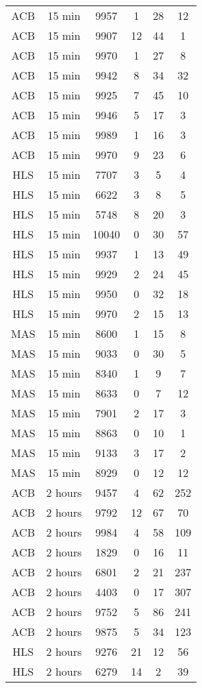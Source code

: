 \begin{center}
\begin{longtable}{cccccc}
\hline \hline
\endlastfoot
ACB	&	15 min	&	9957	&	1	&	28	&	12	\\
ACB	&	15 min	&	9907	&	12	&	44	&	1	\\
ACB	&	15 min	&	9970	&	1	&	27	&	8	\\
ACB	&	15 min	&	9942	&	8	&	34	&	32	\\
ACB	&	15 min	&	9925	&	7	&	45	&	10	\\
ACB	&	15 min	&	9946	&	5	&	17	&	3	\\
ACB	&	15 min	&	9989	&	1	&	16	&	3	\\
ACB	&	15 min	&	9970	&	9	&	23	&	6	\\
HLS	&	15 min	&	7707	&	3	&	5	&	4	\\
HLS	&	15 min	&	6622	&	3	&	8	&	5	\\
HLS	&	15 min	&	5748	&	8	&	20	&	3	\\
HLS	&	15 min	&	10040	&	0	&	30	&	57	\\
HLS	&	15 min	&	9937	&	1	&	13	&	49	\\
HLS	&	15 min	&	9929	&	2	&	24	&	45	\\
HLS	&	15 min	&	9950	&	0	&	32	&	18	\\
HLS	&	15 min	&	9970	&	2	&	15	&	13	\\
MAS	&	15 min	&	8600	&	1	&	15	&	8	\\
MAS	&	15 min	&	9033	&	0	&	30	&	5	\\
MAS	&	15 min	&	8340	&	1	&	9	&	7	\\
MAS	&	15 min	&	8633	&	0	&	7	&	12	\\
MAS	&	15 min	&	7901	&	2	&	17	&	3	\\
MAS	&	15 min	&	8863	&	0	&	10	&	1	\\
MAS	&	15 min	&	9133	&	3	&	17	&	2	\\
MAS	&	15 min	&	8929	&	0	&	12	&	12	\\
ACB	&	2 hours	&	9457	&	4	&	62	&	252	\\
ACB	&	2 hours	&	9792	&	12	&	67	&	70	\\
ACB	&	2 hours	&	9984	&	4	&	58	&	109	\\
ACB	&	2 hours	&	1829	&	0	&	16	&	11	\\
ACB	&	2 hours	&	6801	&	2	&	21	&	237	\\
ACB	&	2 hours	&	4403	&	0	&	17	&	307	\\
ACB	&	2 hours	&	9752	&	5	&	86	&	241	\\
ACB	&	2 hours	&	9875	&	5	&	34	&	123	\\
HLS	&	2 hours	&	9276	&	21	&	12	&	56	\\
HLS	&	2 hours	&	6279	&	14	&	2	&	39	\\

\end{longtable}
\end{center}
